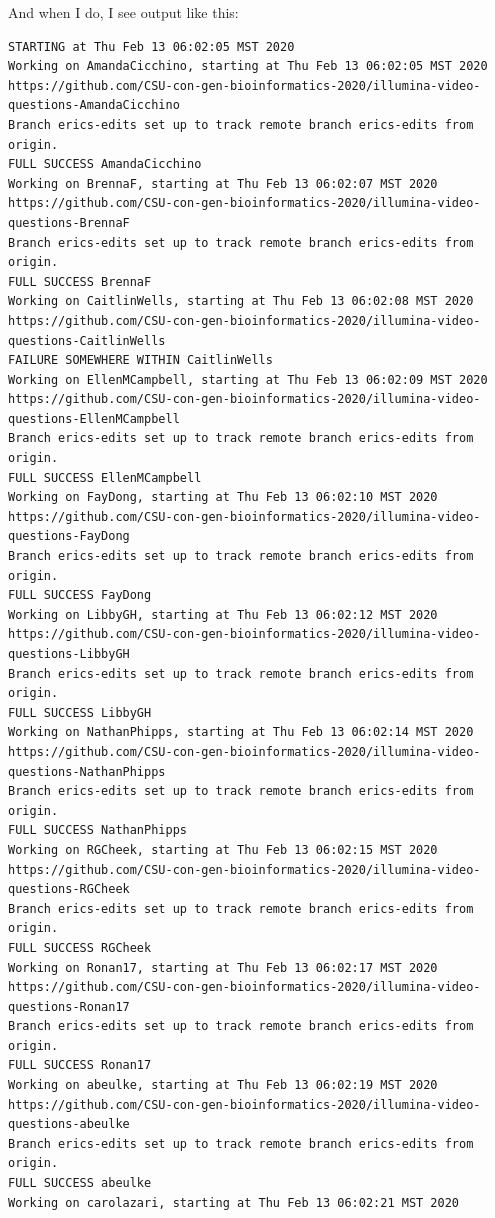\documentclass[]{krantz}
\begin{document}
And when I do, I see output like this:

\begin{verbatim}
STARTING at Thu Feb 13 06:02:05 MST 2020
Working on AmandaCicchino, starting at Thu Feb 13 06:02:05 MST 2020
https://github.com/CSU-con-gen-bioinformatics-2020/illumina-video-questions-AmandaCicchino
Branch erics-edits set up to track remote branch erics-edits from origin.
FULL SUCCESS AmandaCicchino
Working on BrennaF, starting at Thu Feb 13 06:02:07 MST 2020
https://github.com/CSU-con-gen-bioinformatics-2020/illumina-video-questions-BrennaF
Branch erics-edits set up to track remote branch erics-edits from origin.
FULL SUCCESS BrennaF
Working on CaitlinWells, starting at Thu Feb 13 06:02:08 MST 2020
https://github.com/CSU-con-gen-bioinformatics-2020/illumina-video-questions-CaitlinWells
FAILURE SOMEWHERE WITHIN CaitlinWells
Working on EllenMCampbell, starting at Thu Feb 13 06:02:09 MST 2020
https://github.com/CSU-con-gen-bioinformatics-2020/illumina-video-questions-EllenMCampbell
Branch erics-edits set up to track remote branch erics-edits from origin.
FULL SUCCESS EllenMCampbell
Working on FayDong, starting at Thu Feb 13 06:02:10 MST 2020
https://github.com/CSU-con-gen-bioinformatics-2020/illumina-video-questions-FayDong
Branch erics-edits set up to track remote branch erics-edits from origin.
FULL SUCCESS FayDong
Working on LibbyGH, starting at Thu Feb 13 06:02:12 MST 2020
https://github.com/CSU-con-gen-bioinformatics-2020/illumina-video-questions-LibbyGH
Branch erics-edits set up to track remote branch erics-edits from origin.
FULL SUCCESS LibbyGH
Working on NathanPhipps, starting at Thu Feb 13 06:02:14 MST 2020
https://github.com/CSU-con-gen-bioinformatics-2020/illumina-video-questions-NathanPhipps
Branch erics-edits set up to track remote branch erics-edits from origin.
FULL SUCCESS NathanPhipps
Working on RGCheek, starting at Thu Feb 13 06:02:15 MST 2020
https://github.com/CSU-con-gen-bioinformatics-2020/illumina-video-questions-RGCheek
Branch erics-edits set up to track remote branch erics-edits from origin.
FULL SUCCESS RGCheek
Working on Ronan17, starting at Thu Feb 13 06:02:17 MST 2020
https://github.com/CSU-con-gen-bioinformatics-2020/illumina-video-questions-Ronan17
Branch erics-edits set up to track remote branch erics-edits from origin.
FULL SUCCESS Ronan17
Working on abeulke, starting at Thu Feb 13 06:02:19 MST 2020
https://github.com/CSU-con-gen-bioinformatics-2020/illumina-video-questions-abeulke
Branch erics-edits set up to track remote branch erics-edits from origin.
FULL SUCCESS abeulke
Working on carolazari, starting at Thu Feb 13 06:02:21 MST 2020

\end{verbatim}
\end{document}

